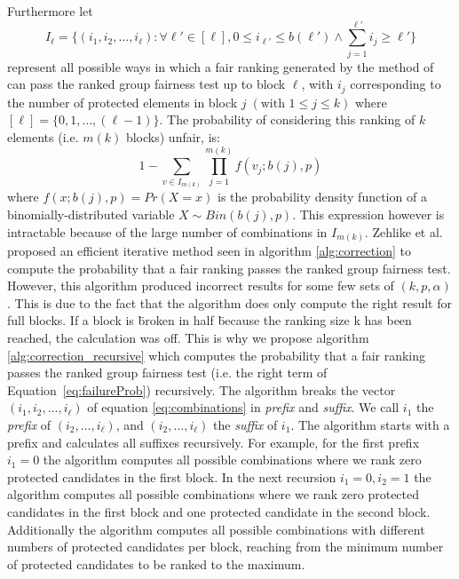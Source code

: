 \noindent Furthermore let
\begin{equation}
\label{eq:combinations}
I_\ell = \{ (i_1, i_2, \ldots, i_\ell): \forall \ell' \in [\ell], 0 \le i_{\ell'} \le b(\ell') \wedge \sum_{j=1}^{\ell'} i_j \ge \ell' \}
\end{equation} represent all possible ways in which a fair ranking generated by the method of \citet{yang2016measuring} can pass the ranked group fairness test up to block $\ell$, with $i_j$ corresponding to the number of protected elements in block $j \; (\text{with } 1 \le j \le k)$ where $[\ell]=\lbrace 0,1,\ldots,(\ell -1) \rbrace$.
%
The probability of considering this ranking of $k$ elements (i.e. $m(k)$ blocks) unfair, is:
\begin{equation} \label{eq:failureProb}
1 - \sum_{v \in I_{m(k)}} \prod_{j=1}^{m(k)} f(v_j; b(j), p)
\end{equation}
%
\noindent where $f(x;b(j),p) = Pr(X = x)$ is the probability density function of a binomially-distributed variable $X \sim Bin(b(j), p)$.
%
This expression however is intractable because of the large number of combinations in $I_{m(k)}$.
%
Zehlike et al. \cite{zehlike2017fair} proposed an efficient iterative method seen in algorithm \ref{alg:correction} to compute the probability that a fair ranking passes the ranked group fairness test.
%
However, this algorithm produced incorrect results for   some few sets of $(k,p,\alpha)$.
%
This is due to the fact that the algorithm does only compute the right result for full blocks.
%
If a block is \" broken in half \" because the ranking size k has been reached, the calculation was off.
%
This is why we propose algorithm \ref{alg:correction_recursive} which computes the probability that a fair ranking passes the ranked group fairness test (i.e. the right term of Equation~\ref{eq:failureProb}) recursively.
%
The algorithm breaks the vector $(i_1, i_2, \ldots ,i_{\ell})$ of equation \ref{eq:combinations} in \textit{prefix} and \textit{suffix}.
%
We call $i_1$ the \textit{prefix} of $(i_2, \ldots, i_{\ell})$, and $(i_2, \ldots, i_{\ell})$ the \textit{suffix} of $i_1$.
%
The algorithm starts with a prefix and calculates all suffixes recursively.
%
For example, for the first prefix $i_1 = 0$ the algorithm computes all possible combinations where we rank zero protected candidates in the first block.
%
In the next recursion $i_1=0, i_2 =1$ the algorithm computes all possible combinations where we rank zero protected candidates in the first block and one protected candidate in the second block.
%
Additionally the algorithm computes all possible combinations with different numbers of protected candidates per block, reaching from the minimum number of protected candidates to be ranked to the maximum.
